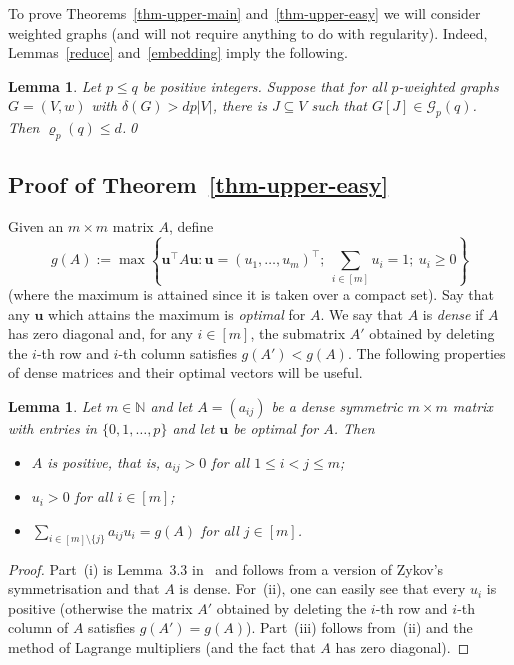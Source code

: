 \documentclass[11pt, a4paper]{article}
\newtheorem{lemma}[theorem]{Lemma}
\theoremstyle{definition}
\newcommand{\cG}{\mathcal{G}}
\begin{document}
To prove Theorems~\ref{thm-upper-main} and~\ref{thm-upper-easy} we will consider weighted graphs (and will not require anything to do with regularity). Indeed, Lemmas~\ref{reduce} and~\ref{embedding} imply the following.

\begin{lemma}\label{lem:summary}
	Let $p \leq q$ be positive integers.
	Suppose that for all $p$-weighted graphs $G=(V,w)$ with $\delta(G) > dp|V|$, there is $J \subseteq V$ such that $G[J] \in \cG_p(q)$. Then $\varrho_p(q) \leq d$.\qed
\end{lemma}


\subsection{Proof of Theorem~\ref{thm-upper-easy}}\label{sec-upper-easy}

Given an $m\times m$ matrix $A$, define
$$
g(A) := \textstyle{\max\left\lbrace \bm{u}^\intercal A\bm{u}: \bm{u} = (u_1,\ldots,u_m)^\intercal;~ \sum_{i \in [m]}u_i=1;~ u_i \geq 0\right\rbrace}
$$
(where the maximum is attained since it is taken over a compact set). Say that any $\bm{u}$ which attains the maximum is \emph{optimal} for $A$.
We say that $A$ is \emph{dense} if $A$ has zero diagonal and, for any $i \in [m]$, the submatrix $A'$ obtained by deleting the $i$-th row and $i$-th column
satisfies $g(A') < g(A)$. The following properties of dense matrices and their optimal vectors will be useful.

\begin{lemma}\label{sym}
	Let $m \in \mathbb{N}$ and let $A = (a_{ij})$ be a dense symmetric $m\times m$ matrix with entries in $\lbrace 0,1,\ldots,p\rbrace$ and let $\bm{u}$ be optimal for $A$.
	Then
	\begin{itemize}
		\item[(i)] $A$ is positive, that is, $a_{ij}>0$ for all $1\le i<j\le m$;
		\item[(ii)] $u_i>0$ for all $i \in [m]$;
		\item[(iii)] $\sum_{i \in [m]\setminus\lbrace j \rbrace}a_{ij}u_i = g(A)$ for all $j \in [m]$.
	\end{itemize}
\end{lemma}

\begin{proof}
	Part~(i) is Lemma~3.3 in~\cite{EHSSSz} and follows from a version of Zykov's symmetrisation and that $A$ is dense. For~(ii), one can easily see that every $u_i$ is positive (otherwise the matrix $A'$ obtained by deleting the $i$-th row and $i$-th column of $A$ satisfies $g(A')=g(A)$).
	Part~(iii) follows from~(ii) and the method of Lagrange multipliers (and the fact that $A$ has zero diagonal).
\end{proof}
\end{document}
